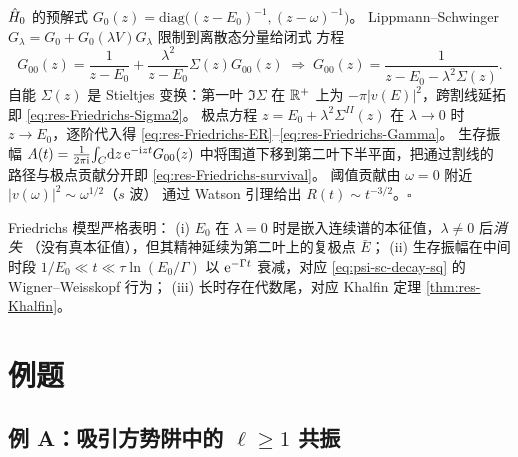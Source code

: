 \begin{proof*}[要点]
  $\hat{H}_0$ 的预解式
  $G_0(z)=\mathrm{diag}\!\big((z-E_0)^{-1},(z-\omega)^{-1}\big)$。
  Lippmann--Schwinger
  $G_\lambda=G_0+G_0(\lambda V)G_\lambda$ 限制到离散态分量给闭式
  方程
  \begin{equation*}
    G_{00}(z)=\frac{1}{z-E_0}+\frac{\lambda^2}{z-E_0}\Sigma(z)G_{00}(z)
    \;\Longrightarrow\;
    G_{00}(z)=\frac{1}{z-E_0-\lambda^2\Sigma(z)}.
  \end{equation*}
  自能 $\Sigma(z)$ 是 Stieltjes 变换：第一叶 $\Im\Sigma$ 在 $\mathbb{R}^+$
  上为 $-\pi|v(E)|^2$，跨割线延拓即 \eqref{eq:res-Friedrichs-Sigma2}。
  极点方程 $z=E_0+\lambda^2\Sigma^{II}(z)$ 在 $\lambda\to 0$ 时
  $z\to E_0$，逐阶代入得
  \eqref{eq:res-Friedrichs-ER}--\eqref{eq:res-Friedrichs-Gamma}。
  生存振幅 $A(t)=\frac{1}{2\pi\mathrm{i}}\!\int_C\!\mathrm{d} z\,\mathrm{e}^{-\mathrm{i} z t}
  G_{00}(z)$ 中将围道下移到第二叶下半平面，把通过割线的
  路径与极点贡献分开即 \eqref{eq:res-Friedrichs-survival}。
  阈值贡献由 $\omega=0$ 附近 $|v(\omega)|^2\sim\omega^{1/2}$（$s$ 波）
  通过 Watson 引理给出 $R(t)\sim t^{-3/2}$。$\square$
\end{proof*}

\begin{remark}
  Friedrichs 模型严格表明：
  (i) $E_0$ 在 $\lambda=0$ 时是嵌入连续谱的本征值，$\lambda\neq 0$ 后\emph{消失}
  （没有真本征值），但其精神延续为第二叶上的复极点 $\bar E$；
  (ii) 生存振幅在中间时段 $1/E_0\ll t\ll \tau\ln(E_0/\Gamma)$
  以 $\mathrm{e}^{-\Gamma t}$ 衰减，对应 \eqref{eq:psi-sc-decay-sq} 的
  Wigner--Weisskopf 行为；
  (iii) 长时存在代数尾，对应 Khalfin 定理 \ref{thm:res-Khalfin}。
\end{remark}

\section{例题}\label{sec:res-examples}

\subsection{例 A：吸引方势阱中的 $\ell\geq 1$ 共振}\label{subsec:res-ex-square}

